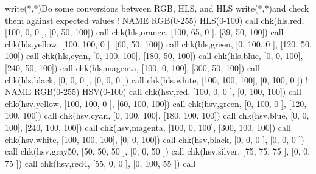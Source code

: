 \begin{DoxyDescription}
write($\ast$,$\ast$)\textquotesingle{}Do some conversions between R\+GB, H\+LS, and H\+LS\textquotesingle{} write($\ast$,$\ast$)\textquotesingle{}and check them against expected values\textquotesingle{} ! N\+A\+ME R\+GB(0-\/255) H\+LS(0-\/100) call chk(\textquotesingle{}hls\textquotesingle{},\textquotesingle{}red\textquotesingle{}, \mbox{[}100, 0, 0 \mbox{]}, \mbox{[}0, 50, 100\mbox{]}) call chk(\textquotesingle{}hls\textquotesingle{},\textquotesingle{}orange\textquotesingle{}, \mbox{[}100, 65, 0 \mbox{]}, \mbox{[}39, 50, 100\mbox{]}) call chk(\textquotesingle{}hls\textquotesingle{},\textquotesingle{}yellow\textquotesingle{}, \mbox{[}100, 100, 0 \mbox{]}, \mbox{[}60, 50, 100\mbox{]}) call chk(\textquotesingle{}hls\textquotesingle{},\textquotesingle{}green\textquotesingle{}, \mbox{[}0, 100, 0 \mbox{]}, \mbox{[}120, 50, 100\mbox{]}) call chk(\textquotesingle{}hls\textquotesingle{},\textquotesingle{}cyan\textquotesingle{}, \mbox{[}0, 100, 100\mbox{]}, \mbox{[}180, 50, 100\mbox{]}) call chk(\textquotesingle{}hls\textquotesingle{},\textquotesingle{}blue\textquotesingle{}, \mbox{[}0, 0, 100\mbox{]}, \mbox{[}240, 50, 100\mbox{]}) call chk(\textquotesingle{}hls\textquotesingle{},\textquotesingle{}magenta\textquotesingle{}, \mbox{[}100, 0, 100\mbox{]}, \mbox{[}300, 50, 100\mbox{]}) call chk(\textquotesingle{}hls\textquotesingle{},\textquotesingle{}black\textquotesingle{}, \mbox{[}0, 0, 0 \mbox{]}, \mbox{[}0, 0, 0 \mbox{]}) call chk(\textquotesingle{}hls\textquotesingle{},\textquotesingle{}white\textquotesingle{}, \mbox{[}100, 100, 100\mbox{]}, \mbox{[}0, 100, 0 \mbox{]}) ! N\+A\+ME R\+GB(0-\/255) H\+SV(0-\/100) call chk(\textquotesingle{}hsv\textquotesingle{},\textquotesingle{}red\textquotesingle{}, \mbox{[}100, 0, 0 \mbox{]}, \mbox{[}0, 100, 100\mbox{]}) call chk(\textquotesingle{}hsv\textquotesingle{},\textquotesingle{}yellow\textquotesingle{}, \mbox{[}100, 100, 0 \mbox{]}, \mbox{[}60, 100, 100\mbox{]}) call chk(\textquotesingle{}hsv\textquotesingle{},\textquotesingle{}green\textquotesingle{}, \mbox{[}0, 100, 0 \mbox{]}, \mbox{[}120, 100, 100\mbox{]}) call chk(\textquotesingle{}hsv\textquotesingle{},\textquotesingle{}cyan\textquotesingle{}, \mbox{[}0, 100, 100\mbox{]}, \mbox{[}180, 100, 100\mbox{]}) call chk(\textquotesingle{}hsv\textquotesingle{},\textquotesingle{}blue\textquotesingle{}, \mbox{[}0, 0, 100\mbox{]}, \mbox{[}240, 100, 100\mbox{]}) call chk(\textquotesingle{}hsv\textquotesingle{},\textquotesingle{}magenta\textquotesingle{}, \mbox{[}100, 0, 100\mbox{]}, \mbox{[}300, 100, 100\mbox{]}) call chk(\textquotesingle{}hsv\textquotesingle{},\textquotesingle{}white\textquotesingle{}, \mbox{[}100, 100, 100\mbox{]}, \mbox{[}0, 0, 100\mbox{]}) call chk(\textquotesingle{}hsv\textquotesingle{},\textquotesingle{}black\textquotesingle{}, \mbox{[}0, 0, 0 \mbox{]}, \mbox{[}0, 0, 0 \mbox{]}) call chk(\textquotesingle{}hsv\textquotesingle{},\textquotesingle{}gray50\textquotesingle{}, \mbox{[}50, 50, 50 \mbox{]}, \mbox{[}0, 0, 50 \mbox{]}) call chk(\textquotesingle{}hsv\textquotesingle{},\textquotesingle{}silver\textquotesingle{}, \mbox{[}75, 75, 75 \mbox{]}, \mbox{[}0, 0, 75 \mbox{]}) call chk(\textquotesingle{}hsv\textquotesingle{},\textquotesingle{}red4\textquotesingle{}, \mbox{[}55, 0, 0 \mbox{]}, \mbox{[}0, 100, 55 \mbox{]}) call 
\end{DoxyDescription}
